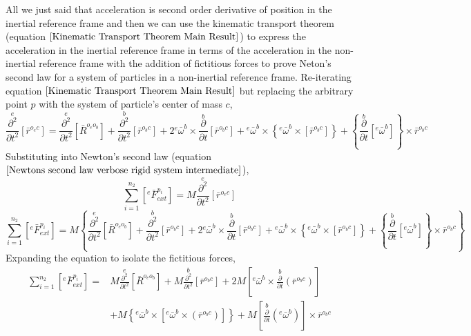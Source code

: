 All we just said that acceleration is second order derivative of position in the inertial reference frame and then we can use the kinematic transport theorem (equation $\ref{Kinematic Transport Theorem Main Result}$) to express the acceleration in the inertial reference frame in terms of the acceleration in the non-inertial reference frame with the addition of fictitious forces to prove Neton's second law for a system of particles in a non-inertial reference frame.
Re-iterating equation $\ref{Kinematic Transport Theorem Main Result}$ but replacing the arbitrary point $p$ with the system of particle's center of mass $c$, 
$$\overset{e}{\frac{\partial^{2}}{\partial t^{2}}}[\bar{r}^{o_{e}c}] =
\overset{e}{\frac{\partial^{2}}{\partial t^{2}}}[\bar{R}^{o_{e}o_{b}}]
+ \overset{b}{\frac{\partial^{2}}{\partial t^{2}}}[\bar{r}^{o_{b}c}] 
+ 2{}^{e}\bar{\omega}^{b}\times\overset{b}{\frac{\partial}{\partial t}}[\bar{r}^{o_{b}c}]
+ {}^{e}\bar{\omega}^{b}\times\left\{{}^{e}\bar{\omega}^{b}\times\left[\bar{r}^{o_{b}c}\right]\right\}    
+ \left\{\overset{b}{\frac{\partial}{\partial t}}[{}^{e}\bar{\omega}^{b}]\right\}\times\bar{r}^{o_{b}c}$$
Substituting into Newton's second law (equation $\ref{Newtons second law verbose rigid system intermediate}$),
$$\sum^{n_{2}}_{i = 1}\left[{}^{e}\bar{F}^{p_{i}}_{ext}\right] = M\overset{e}{\frac{\partial^{2}}{\partial t^{2}}}[\bar{r}^{o_{e}c}]$$
$$\sum^{n_{2}}_{i = 1}\left[{}^{e}\bar{F}^{p_{i}}_{ext}\right] = M\left\{ \overset{e}{\frac{\partial^{2}}{\partial t^{2}}}[\bar{R}^{o_{e}o_{b}}]
+ \overset{b}{\frac{\partial^{2}}{\partial t^{2}}}[\bar{r}^{o_{b}c}] 
+ 2{}^{e}\bar{\omega}^{b}\times\overset{b}{\frac{\partial}{\partial t}}[\bar{r}^{o_{b}c}]
+ {}^{e}\bar{\omega}^{b}\times\left\{{}^{e}\bar{\omega}^{b}\times\left[\bar{r}^{o_{b}c}\right]\right\}    
+ \left\{\overset{b}{\frac{\partial}{\partial t}}[{}^{e}\bar{\omega}^{b}]\right\}\times\bar{r}^{o_{b}c} \right\}$$
Expanding the equation to isolate the fictitious forces,
\begin{align*}
\sum^{n_{2}}_{i = 1}\left[{}^{e}\bar{F}^{p_{i}}_{ext}\right] = &  M\overset{e}{\frac{\partial^{2}}{\partial t^{2}}}[\bar{R}^{o_{e}o_{b}}]
+ M\overset{b}{\frac{\partial^{2}}{\partial t^{2}}}[\bar{r}^{o_{b}c}] 
+ 2M\left[{}^{e}\bar{\omega}^{b}\times\overset{b}{\frac{\partial}{\partial t}}(\bar{r}^{o_{b}c})\right] \\ &
+ M\left\{{}^{e}\bar{\omega}^{b}\times\left[{}^{e}\bar{\omega}^{b}\times\left(\bar{r}^{o_{b}c}\right)\right]\right\}
+ M\left[\overset{b}{\frac{\partial}{\partial t}}({}^{e}\bar{\omega}^{b})\right]\times\bar{r}^{o_{b}c} 
\end{align*}
